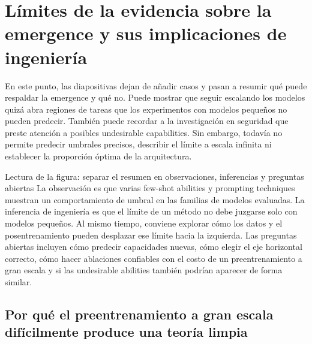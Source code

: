 \section{Límites de la evidencia sobre la emergence y sus implicaciones de ingeniería}

En este punto, las diapositivas dejan de añadir casos y pasan a resumir qué puede respaldar la emergence y qué no. Puede mostrar que seguir escalando los modelos quizá abra regiones de tareas que los experimentos con modelos pequeños no pueden predecir. También puede recordar a la investigación en seguridad que preste atención a posibles undesirable capabilities. Sin embargo, todavía no permite predecir umbrales precisos, describir el límite a escala infinita ni establecer la proporción óptima de la arquitectura.


\begin{knowledgebox}{Lectura de la figura: separar el resumen en observaciones, inferencias y preguntas abiertas}
La observación es que varias few-shot abilities y prompting techniques muestran un comportamiento de umbral en las familias de modelos evaluadas. La inferencia de ingeniería es que el límite de un método no debe juzgarse solo con modelos pequeños. Al mismo tiempo, conviene explorar cómo los datos y el posentrenamiento pueden desplazar ese límite hacia la izquierda. Las preguntas abiertas incluyen cómo predecir capacidades nuevas, cómo elegir el eje horizontal correcto, cómo hacer ablaciones confiables con el costo de un preentrenamiento a gran escala y si las undesirable abilities también podrían aparecer de forma similar.
\end{knowledgebox}


\subsection{Por qué el preentrenamiento a gran escala difícilmente produce una teoría limpia}

